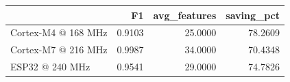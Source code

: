 \begin{tabular}{lrrr}
\toprule
 & F1 & avg_features & saving_pct \\
\midrule
Cortex-M4 @ 168 MHz & 0.9103 & 25.0000 & 78.2609 \\
Cortex-M7 @ 216 MHz & 0.9987 & 34.0000 & 70.4348 \\
ESP32 @ 240 MHz & 0.9541 & 29.0000 & 74.7826 \\
\bottomrule
\end{tabular}
